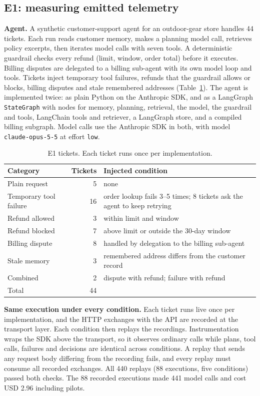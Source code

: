 \documentclass[conference]{IEEEtran}
\begin{document}
\subsection{E1: measuring emitted telemetry}
\label{sec:e1method}

\textbf{Agent.} A synthetic customer-support agent for an outdoor-gear
store handles 44 tickets. Each run reads customer memory, makes a
planning model call, retrieves policy excerpts, then iterates model
calls with seven tools. A deterministic guardrail checks every refund
(limit, window, order total) before it executes. Billing disputes are
delegated to a billing sub-agent with its own model loop and tools.
Tickets inject temporary tool failures, refunds that the guardrail
allows or blocks, billing disputes and stale remembered addresses
(Table~\ref{tab:tickets}). The
agent is implemented twice: as plain Python on the Anthropic SDK, and as
a LangGraph \texttt{StateGraph} with nodes for memory, planning,
retrieval, the model, the guardrail and tools, LangChain tools and
retriever, a LangGraph store, and a compiled billing subgraph. Model
calls use the Anthropic SDK in both, with model \texttt{claude-opus-5-5}
at effort \texttt{low}.

\begin{table}[t]
\centering
\scriptsize
\caption{E1 tickets. Each ticket runs once per implementation.}
\label{tab:tickets}
\begin{tabular}{@{}lrp{}@{}}
\toprule
Category & Tickets & Injected condition \\
\midrule
Plain request & 5 & none \\
Temporary tool failure & 16 & order lookup fails 3--5 times; 8 tickets ask the agent to keep retrying \\
Refund allowed & 3 & within limit and window \\
Refund blocked & 7 & above limit or outside the 30-day window \\
Billing dispute & 8 & handled by delegation to the billing sub-agent \\
Stale memory & 3 & remembered address differs from the customer record \\
Combined & 2 & dispute with refund; failure with refund \\
\midrule
Total & 44 & \\
\bottomrule
\end{tabular}
\end{table}

\textbf{Same execution under every condition.} Each ticket runs live
once per implementation, and the HTTP exchanges with the API are
recorded at the transport layer. Each condition then replays the
recordings. Instrumentation wraps the SDK above the transport, so it
observes ordinary calls while plans, tool calls, failures and decisions
are identical across conditions. A replay that sends any request body
differing from the recording fails, and every replay must consume all
recorded exchanges. All 440 replays (88 executions, five conditions)
passed both checks. The 88 recorded executions made 441 model calls and
cost USD 2.96 including pilots.
\end{document}
